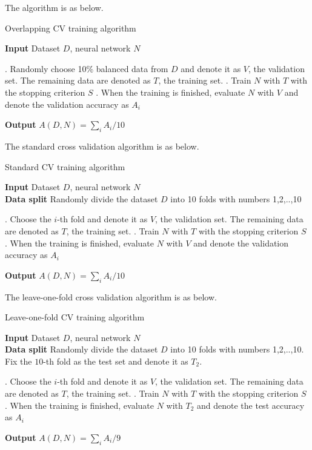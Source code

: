The algorithm is as below.
\begin{algorithm}%
	\caption{Overlapping CV training algorithm}
\hspace*{\algorithmicindent} \textbf{Input} Dataset $D$, neural network $N$
	\begin{algorithmic}
		. Randomly choose 10\% balanced data from $D$ and denote it as $V$, the validation set. The remaining data are  denoted as $T$, the training set.
		. Train $N$ with $T$ with the stopping criterion $S$ 
		. When the training is finished, evaluate $N$ with $V$ and denote the validation accuracy as $A_i$
	\EndFor
	\end{algorithmic}
\hspace*{\algorithmicindent} \textbf{Output} $A(D,N)=\sum_i A_i /10$
\end{algorithm}

The  standard  cross validation algorithm is as below.
\begin{algorithm}%
	\caption{Standard CV training algorithm}
\hspace*{\algorithmicindent} \textbf{Input} Dataset $D$, neural network $N$\\
\hspace*{\algorithmicindent} \textbf{Data split}  Randomly divide the dataset $D$ into 10 folds with numbers 1,2,..,10
	\begin{algorithmic}
	\For{$i = 1:10$}
		. Choose the $i$-th fold and denote it as $V$, the validation set. The remaining data are  denoted as $T$, the training set.
		. Train $N$ with $T$ with the stopping criterion $S$ 
		. When the training is finished, evaluate $N$ with $V$ and denote the validation accuracy as $A_i$
	\EndFor
	\end{algorithmic}
\hspace*{\algorithmicindent} \textbf{Output} $A(D,N)=\sum_i A_i /10$
\end{algorithm}

The  leave-one-fold  cross validation algorithm is as below.
\begin{algorithm}%
	\caption{Leave-one-fold CV training algorithm}
\hspace*{\algorithmicindent} \textbf{Input} Dataset $D$, neural network $N$\\
\hspace*{\algorithmicindent} \textbf{Data split}  Randomly divide the dataset $D$ into 10 folds with numbers 1,2,..,10. Fix the $10$-th fold as the test set and denote it as $T_2$.
	\begin{algorithmic}
	\For{$i = 1:9$}
		. Choose the $i$-th fold and denote it as $V$, the validation set. The remaining data are  denoted as $T$, the training set.
		. Train $N$ with $T$ with the stopping criterion $S$ 
		. When the training is finished, evaluate $N$ with $T_2$ and denote the test accuracy as $A_i$
	\EndFor
	\end{algorithmic}
\hspace*{\algorithmicindent} \textbf{Output} $A(D,N)=\sum_i A_i /9$
\end{algorithm}

